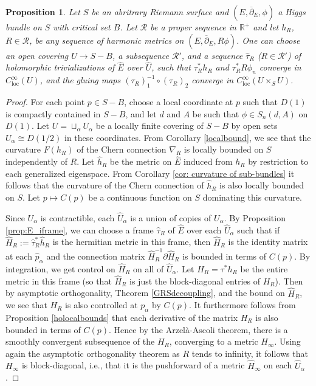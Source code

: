 \documentclass[10pt]{amsart}
\newcommand{\R}{\mathbb R}
\newtheorem{prop}[thm]{Proposition}
\theoremstyle{definition}
\begin{document}
\begin{prop} \label{prop: bundle convergence} Let $S$ be an abritrary Riemann surface and  $(E,\overline{\partial}_E,\phi)$ a Higgs bundle on $S$ with critical set $B$. Let $\mathcal{R}$ be a proper sequence in $\R^+$ and let $h_R$, $R \in \mathcal{R}$, be any sequence of harmonic metrics on $(E,\overline{\partial}_E,R\phi)$. One can choose an open covering $U \to S-B$, a subsequence $\mathcal{R}'$, and a sequence $\hat{\tau}_R$ ($R \in \mathcal{R}'$) of holomorphic trivializations of $\hat{E}$ over $\hat{U}$, such that $\tau_R^*h_R$ and $\tau_R^*R\phi_n$ converge in $C^\infty_\mathrm{loc}(U)$, and the gluing maps $(\tau_R)_1^{-1} \circ (\tau_R)_2$ converge in $C^\infty_\mathrm{loc}(U \times_S U)$.
\end{prop}

\begin{proof}
For each point $p \in S - B$, choose a local coordinate at $p$ such that $D(1)$ is compactly contained in $S-B$, and let $d$ and $A$ be such that $\phi \in S_n(d,A)$ on $D(1)$. Let $U = \sqcup_\alpha U_\alpha$ be a locally finite covering of $S-B$ by open sets $U_\alpha \cong D(1/2)$ in these coordinates. From Corollary \ref{localbound}, we see that the curvature $F(h_R)$ of the Chern connection $\nabla_R$ is locally bounded on $S$ independently of $R$. Let $\hat{h}_R$ be the metric on $\hat{E}$ induced from $h_R$ by restriction to each generalized eigenspace. From Corollary \ref{cor: curvature of sub-bundles} it follows that the curvature of the Chern connection of $\hat{h}_R$ is also locally bounded on $S$. Let $p\mapsto C(p)$ be a continuous function on $S$ dominating this curvature. 

Since $U_\alpha$ is contractible, each $\hat{U}_\alpha$ is a union of copies of $U_\alpha$. By Proposition \ref{prop:E_iframe}, we can choose a frame $\hat{\tau}_R$ of $\hat{E}$ over each $\hat{U}_\alpha$ such that if $\hat{H}_R := \hat{\tau}_R^*\hat{h}_R$ is the hermitian metric in this frame, then $\hat{H}_R$ is the identity matrix at each $\hat{p}_\alpha$ and the connection matrix $\hat{H}_R^{-1} \partial \hat{H}_R$ is bounded in terms of $C(p)$. By integration, we get control on $\hat{H}_R$ on all of $\hat{U}_\alpha$. Let $H_R = \tau^* h_R$ be the entire metric in this frame (so that $\hat{H}_R$ is just the block-diagonal entries of $H_R$). Then by asymptotic orthogonality, Theorem \ref{GRSdecoupling}, and the bound on $\hat{H}_R$, we see that $H_R$ is also controlled at $p_\alpha$ by $C(p)$. It furthermore follows from Proposition \ref{holocalbounds} that each derivative of the matrix $H_R$ is also bounded in terms of $C(p)$. Hence by the Arzel{\`a}-Ascoli theorem, there is a smoothly convergent subsequence of the $H_R$, converging to a metric $H_\infty$. Using again the asymptotic orthogonality theorem as $R$ tends to infinity, it follows that $H_\infty$ is block-diagonal, i.e., that it is the pushforward of a metric $\hat{H}_\infty$ on each $\hat{U}_\alpha$.


\end{proof}
\end{document}
